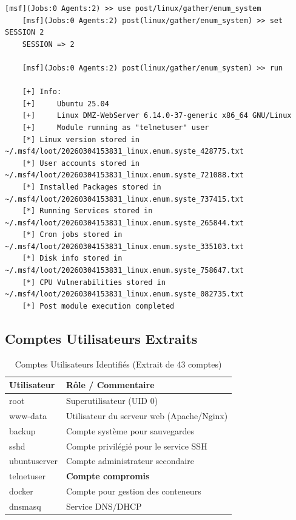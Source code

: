 \documentclass[12pt,a4paper,openany]{report}
\newcommand{\tableheadcolor}{\rowcolor{tableheadbg}}
\begin{document}
\begin{lstlisting}[caption=Module post/linux/gather/enum\_system]
	[msf](Jobs:0 Agents:2) >> use post/linux/gather/enum_system
	[msf](Jobs:0 Agents:2) post(linux/gather/enum_system) >> set SESSION 2
	SESSION => 2
	
	[msf](Jobs:0 Agents:2) post(linux/gather/enum_system) >> run
	
	[+] Info:
	[+]     Ubuntu 25.04
	[+]     Linux DMZ-WebServer 6.14.0-37-generic x86_64 GNU/Linux
	[+]     Module running as "telnetuser" user
	[*] Linux version stored in ~/.msf4/loot/20260304153831_linux.enum.syste_428775.txt
	[*] User accounts stored in ~/.msf4/loot/20260304153831_linux.enum.syste_721088.txt
	[*] Installed Packages stored in ~/.msf4/loot/20260304153831_linux.enum.syste_737415.txt
	[*] Running Services stored in ~/.msf4/loot/20260304153831_linux.enum.syste_265844.txt
	[*] Cron jobs stored in ~/.msf4/loot/20260304153831_linux.enum.syste_335103.txt
	[*] Disk info stored in ~/.msf4/loot/20260304153831_linux.enum.syste_758647.txt
	[*] CPU Vulnerabilities stored in ~/.msf4/loot/20260304153831_linux.enum.syste_082735.txt
	[*] Post module execution completed
\end{lstlisting}

\subsection{Comptes Utilisateurs Extraits}

\begin{table}[ht]
	\centering
	\small
	\renewcommand{\arraystretch}{1.3}
	\setlength{\arrayrulewidth}{0.5pt}
	\begin{tabular}{>{\ttfamily}p{3.5cm} p{8.5cm}}
		\arrayrulecolor{tableborder}
		\hline
		\tableheadcolor
		\textcolor{tableheadfg}{\textbf{Utilisateur}} &
		\textcolor{tableheadfg}{\textbf{Rôle / Commentaire}} \\
		\hline
		\rowcolor{tablerowalt}
		root & Superutilisateur (UID 0) \\
		www-data & Utilisateur du serveur web (Apache/Nginx) \\
		\rowcolor{tablerowalt}
		backup & Compte système pour sauvegardes \\
		sshd & Compte privilégié pour le service SSH \\
		\rowcolor{tablerowalt}
		ubuntuserver & Compte administrateur secondaire \\
		telnetuser & \textcolor{accent}{\textbf{Compte compromis}} \\
		\rowcolor{tablerowalt}
		docker & Compte pour gestion des conteneurs \\
		dnsmasq & Service DNS/DHCP \\
		\hline
	\end{tabular}
	\caption{Comptes Utilisateurs Identifiés (Extrait de 43 comptes)}
	\label{tab:user-accounts}
\end{table}
\end{document}
